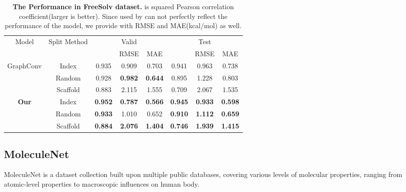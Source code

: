 \documentclass[letterpaper]{article} \usepackage{aaai18}  \usepackage{times}  \usepackage{helvet}  \usepackage{courier}  \usepackage{url}  \usepackage{graphicx}  \usepackage{amsmath}
\begin{document}
\begin{table*}[!h]
\caption{\textbf{The Performance in FreeSolv dataset.}  is squared Pearson correlation coefficient(larger is better). Since  used by \cite{wu2017moleculenet} can not perfectly reflect the performance of the model, we provide with RMSE and MAE(kcal/mol) as well. }
\label{tbl::freesolv}
\vskip 0.15in
\begin{center}
\begin{small}
\begin{tabular}{|c|c|c|c|c|c|c|c|}
\hline
\multirow{2}{*}{Model}         & \multirow{2}{*}{Split Method}&  \multicolumn{3}{c|}{Valid}  &\multicolumn{3}{c|}{Test} \\
\cline{3-8}
                               &             &  & RMSE   & MAE   &  & RMSE  & MAE\\
\hline
\multirow{3}{*}{GraphConv}     & Index       & 0.935          & 0.909          & 0.703          & 0.941          & 0.963          & 0.738 \\
                               & Random      & 0.928          & \textbf{0.982}          & \textbf{0.644} & 0.895          & 1.228          & 0.803 \\
                               & Scaffold    & 0.883          & 2.115          & 1.555          & 0.709          & 2.067          & 1.535 \\
\hline
\multirow{3}{*}{\textbf{Our}}  & Index       & \textbf{0.952} & \textbf{0.787} & \textbf{0.566} & \textbf{0.945} & \textbf{0.933} & \textbf{0.598} \\
                               & Random      & \textbf{0.933} & 1.010          & 0.652          & \textbf{0.910} & \textbf{1.112} & \textbf{0.659} \\
                               & Scaffold    & \textbf{0.884} & \textbf{2.076} & \textbf{1.404} & \textbf{0.746} & \textbf{1.939} & \textbf{1.415} \\  
\hline
\end{tabular}
\end{small}
\end{center}
\vskip -0.1in
\end{table*}

\subsection{MoleculeNet} 
MoleculeNet is a dataset collection built upon multiple public databases, covering various levels of molecular properties, ranging from atomic-level properties to macroscopic influences on human body.
\end{document}
